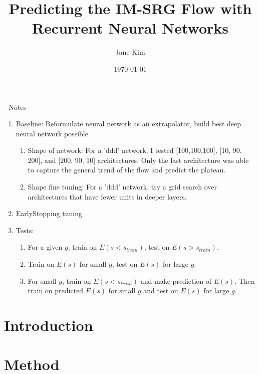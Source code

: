 \documentclass[prb, aps, twocolumn, showpacs, 10pt]{revtex4-1}
\begin{document}
\title {Predicting the IM-SRG Flow with Recurrent Neural Networks}
\author{Jane Kim}
\date{\today}
\begin{abstract}
\vspace*{3mm}
\end{abstract}
\maketitle

- Notes -
\begin{enumerate}
	\item Baseline: Reformulate neural network as an extrapolator, build best deep neural network possible
	\begin{enumerate}
	\item Shape of network: For a 'ddd' network, I tested [100,100,100], [10, 90, 200], and [200, 90, 10] architectures. Only the last architecture was able to capture the general trend of the flow and predict the plateau. 
	\item Shape fine tuning: For a 'ddd' network, try a grid search over architectures that have fewer units in deeper layers.
	\end{enumerate}
	\item EarlyStopping tuning
	\item Tests:
	\begin{enumerate}
		\item For a given $g$, train on $E(s<s_{train})$, test on $E(s>s_{train})$.
		\item Train on $E(s)$ for small $g$, test on $E(s)$ for large $g$.
		\item For small $g$, train on $E(s<s_{train})$ and make prediction of $E(s)$. Then train on predicted $E(s)$ for small $g$ and test on $E(s)$ for large $g$.
	\end{enumerate}
\end{enumerate}

\section{Introduction}

\section{Method}
\end{document}
